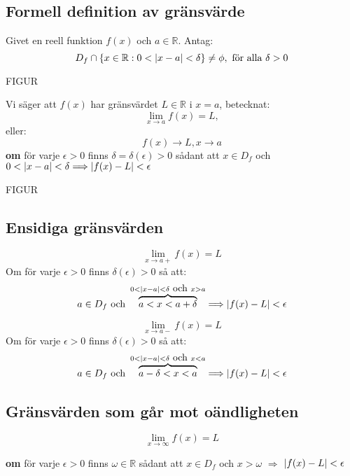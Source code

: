 \subsection{Formell definition av gränsvärde} %
\label{sub:formell_definition_av_gr_nsv_rde}

Givet en reell funktion $f(x)$ och $a \in \mathbb{R}$. Antag:
\[
D_f \cap \{x \in \mathbb{R}: 0 < \lvert x - a\rvert < \delta \} \neq \phi, \mbox{ för alla } \delta > 0
\]
\begin{center}
	FIGUR
\end{center}
Vi säger att $f(x)$ har gränsvärdet $L \in \mathbb{R}$ i $x = a$, betecknat:
\[
\lim_{x \to a}f(x) = L, 
\]
eller:
\[
f(x) \rightarrow L, x \rightarrow a
\]
\textbf{om} för varje $\epsilon > 0$ finns $\delta = \delta(\epsilon) > 0$ sådant att $x \in D_f$ och $ 0 < \lvert x - a\rvert < \delta \Longrightarrow \lvert f(x) - L\rvert < \epsilon$
\begin{center}
	FIGUR
\end{center}

\subsection{Ensidiga gränsvärden} %
\label{sub:ensidiga_gr_nsv_rden}

\[
\lim\limits_{x \to a+}f(x) = L
\]
Om för varje $\epsilon > 0$ finns $\delta(\epsilon) > 0$ så att:
\[
a \in D_f \mbox{ och } \overbrace{a < x < a + \delta}^{0 < \lvert x - a\rvert < \delta \mbox{ och }x > a} \Longrightarrow \lvert f(x) - L\rvert < \epsilon
\]

\[
\lim\limits_{x \to a-}f(x) = L
\]
Om för varje $\epsilon > 0$ finns $\delta(\epsilon) > 0$ så att:
\[
a \in D_f \mbox{ och } \overbrace{a - \delta < x < a}^{0 < \lvert x-a\rvert < \delta \mbox{ och }x < a} \Longrightarrow \lvert f(x) - L\rvert < \epsilon
\]

\subsection{Gränsvärden som går mot oändligheten} %
\label{sec:gr_nsv_rden_som_g_r_mot_o_ndligheten}

\[
\lim\limits_{x \to \infty} f(x) = L
\]

\textbf{om} för varje $\epsilon > 0$ finns $\omega \in \mathbb{R}$ sådant att $x \in D_f$ och $x > \omega$ $\Longrightarrow$ $\lvert f(x) - L\rvert < \epsilon$

